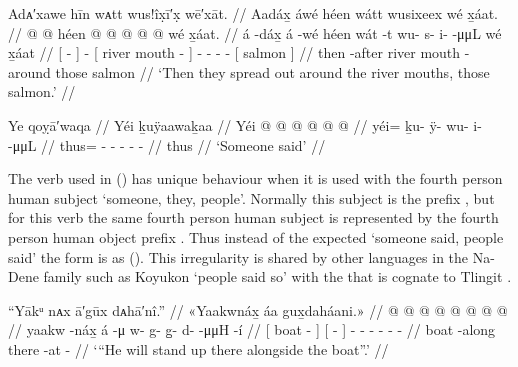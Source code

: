 \ex\label{ex:100-103-name-all-rivers}%
%
\begingl
	\glpreamble	Adᴀ′xawe hīn wᴀtt wus!îx̣ī′x̣ wē′xāt. //
	\glpreamble	Aadáx̱ áwé héen wátt wusixeex wé x̱áat. //
	\gla	{}  @ {} {}  @ {} 
		{} héen  @ {} {}
		 @ {} @ {} @ {} @ {}
		{} wé x̱áat. {} //
	\glb	{} á -dáx̱ {} á -wé
		{} héen wát -t {} 
		wu- s- i-  -μμL
		{} wé x̱áat {} //
	\glc	{}[  - {}]  -
		{}[ river mouth - {}]
		- - -  -
		{}[  salmon {}] //
	\gld	{} then -after {}  {} 
		{} river mouth -around {}
		 {} {} {} {}
		{} those salmon {} //
	\glft	‘Then they spread out around the river mouths, those salmon.’
		//
\endgl
\xe

\ex\label{ex:100-104-someone-said}%
%
\begingl
	\glpreamble	Ye qoỵā′waqa //
	\glpreamble	Yéi ḵuÿaawaḵaa //
	\gla	Yéi @  @ {} @ {} @ {} @ {} @ {} //
	\glb	yéi= ḵu- ÿ- wu- i-  -μμL //
	\glc	thus= - - - -  - //
	\gld	thus  {} {} {} {} {} //
	\glft	‘Someone said’
		//
\endgl
\xe

The verb  used in (\lastx) has unique behaviour when it is used with the fourth person human subject ‘someone, they, people’.
Normally this subject is the prefix , but for this verb the same fourth person human subject is represented by the fourth person human object prefix .
Thus instead of the expected  ‘someone said, people said’ the form is  as (\lastx).
This irregularity is shared by other languages in the Na-Dene family such as Koyukon  ‘people said so’ with the  that is cognate to Tlingit  \parencite[437]{jette-jones:2000}.

\ex\label{ex:100-105-someone-said}%
%
\begingl
	\glpreamble	“Yākᵘ nᴀx ā′gūx dᴀhā′nî.” //
	\glpreamble	«\!Yaakwnáx̱ áa gux̱daháani.\!» //
	\gla	{}  @ {} {}
		{}  @ {} {}
		 @ {} @ {} @ {} @ {} @ {} @ {} //
	\glb	{} yaakw -náx̱ {} 
		{} á -μ {}
		w- g- g̱- d-  -μμH -í //
	\glc	{}[ boat - {}]
		{}[  - {}]
		- - - -  - - //
	\gld	{} boat -along {}
		{} there -at {}
		 {} {} {} {} {} {} - //
	\glft	‘“He will stand up there alongside the boat”.’
		//
\endgl
\xe

